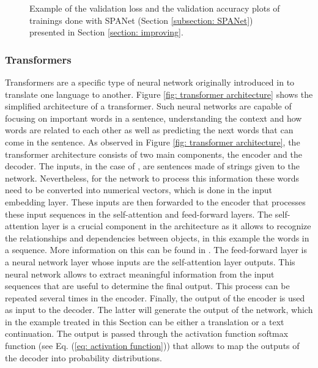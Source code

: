 \begin{figure}[h!]
\begin{subfigure}[b]{0.45\textwidth}
    \end{subfigure}
    \caption{Example of the validation loss and the validation accuracy plots of trainings done with SPANet (Section \ref{subsection: SPANet}) presented in Section \ref{section: improving}.}
    \label{fig: validation}
\end{figure}

\subsubsection{Transformers} \label{subsection: Attention based transformers}

Transformers are a specific type of neural network originally introduced in \cite{attentiontransformer} to translate one language to another. Figure \ref{fig: transformer architecture} shows the simplified architecture of a transformer. Such neural networks are capable of focusing on important words in a sentence, understanding the context and how words are related to each other as well as predicting the next words that can come in the sentence. As observed in Figure \ref{fig: transformer architecture}, the transformer architecture consists of two main components, the encoder and the decoder. The inputs, in the case of \cite{attentiontransformer}, are sentences made of strings given to the network. Nevertheless, for the network to process this information these words need to be converted into numerical vectors, which is done in the input embedding layer. These inputs are then forwarded to the encoder that processes these input sequences in the self-attention and feed-forward layers. The self-attention layer is a crucial component in the architecture as it allows to recognize the relationships and dependencies between objects, in this example the words in a sequence. More information on this can be found in \cite{attentiontransformer}. The feed-forward layer is a neural network layer whose inputs are the self-attention layer outputs. This neural network allows to extract meaningful information from the input sequences that are useful to determine the final output. This process can be repeated several times in the encoder. Finally, the output of the encoder is used as input to the decoder. The latter will generate the output of the network, which in the example treated in this Section can be either a translation or a text continuation. The output is passed through the activation function softmax function (see Eq. (\ref{eq: activation function})) that allows to map the outputs of the decoder into probability distributions.

